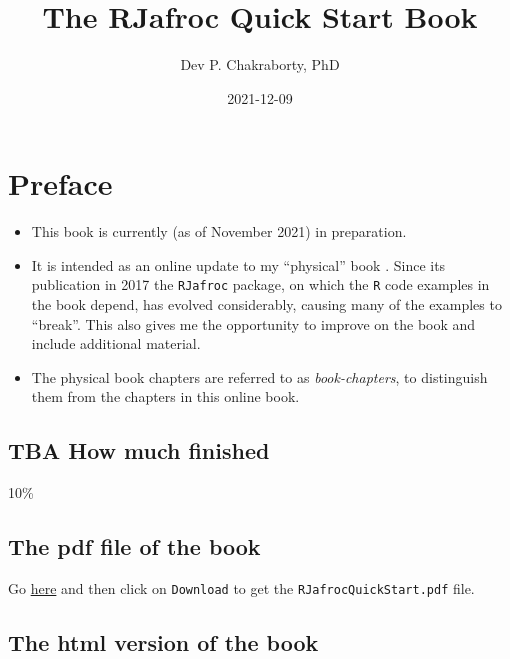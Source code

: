 \documentclass[
]{book}
\title{The RJafroc Quick Start Book}
\author{Dev P. Chakraborty, PhD}
\date{2021-12-09}
\providecommand{\tightlist}{%
  \setlength{\itemsep}{0pt}\setlength{\parskip}{0pt}}
\begin{document}
\maketitle

{
\setcounter{tocdepth}{1}
\tableofcontents
}
\hypertarget{preface}{%
\chapter*{Preface}\label{preface}}

\begin{itemize}
\tightlist
\item
  This book is currently (as of November 2021) in preparation.
\item
  It is intended as an online update to my ``physical'' book \citep{chakraborty2017observer}. Since its publication in 2017 the \texttt{RJafroc} package, on which the \texttt{R} code examples in the book depend, has evolved considerably, causing many of the examples to ``break''. This also gives me the opportunity to improve on the book and include additional material.
\item
  The physical book chapters are referred to as \emph{book-chapters}, to distinguish them from the chapters in this online book.
\end{itemize}

\hypertarget{tba-how-much-finished}{%
\section*{TBA How much finished}\label{tba-how-much-finished}}

10\%

\hypertarget{the-pdf-file-of-the-book}{%
\section*{The pdf file of the book}\label{the-pdf-file-of-the-book}}

Go \href{https://github.com/dpc10ster/RJafrocQuickStart/blob/gh-pages/RJafrocQuickStart.pdf}{here} and then click on \texttt{Download} to get the \texttt{RJafrocQuickStart.pdf} file.

\hypertarget{the-html-version-of-the-book}{%
\section*{The html version of the book}\label{the-html-version-of-the-book}}
\end{document}
